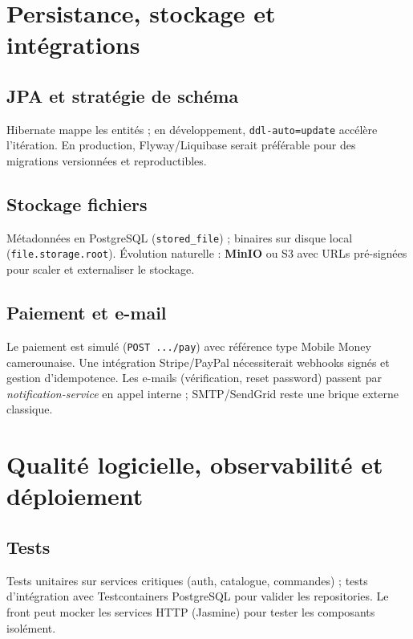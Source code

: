 \documentclass[12pt,a4paper]{report}
\begin{document}
\chapter{Persistance, stockage et intégrations}

\section{JPA et stratégie de schéma}
Hibernate mappe les entités ; en développement, \texttt{ddl-auto=update} accélère l'itération. En production, Flyway/Liquibase serait préférable pour des migrations versionnées et reproductibles.\par

\section{Stockage fichiers}
Métadonnées en PostgreSQL (\texttt{stored\_file}) ; binaires sur disque local (\texttt{file.storage.root}). Évolution naturelle : \textbf{MinIO} ou S3 avec URLs pré-signées pour scaler et externaliser le stockage.\par

\section{Paiement et e-mail}
Le paiement est simulé (\texttt{POST .../pay}) avec référence type Mobile Money camerounaise. Une intégration Stripe/PayPal nécessiterait webhooks signés et gestion d'idempotence. Les e-mails (vérification, reset password) passent par \textit{notification-service} en appel interne ; SMTP/SendGrid reste une brique externe classique.\par

\chapter{Qualité logicielle, observabilité et déploiement}

\section{Tests}
Tests unitaires sur services critiques (auth, catalogue, commandes) ; tests d'intégration avec Testcontainers PostgreSQL pour valider les repositories. Le front peut mocker les services HTTP (Jasmine) pour tester les composants isolément.\par
\end{document}
